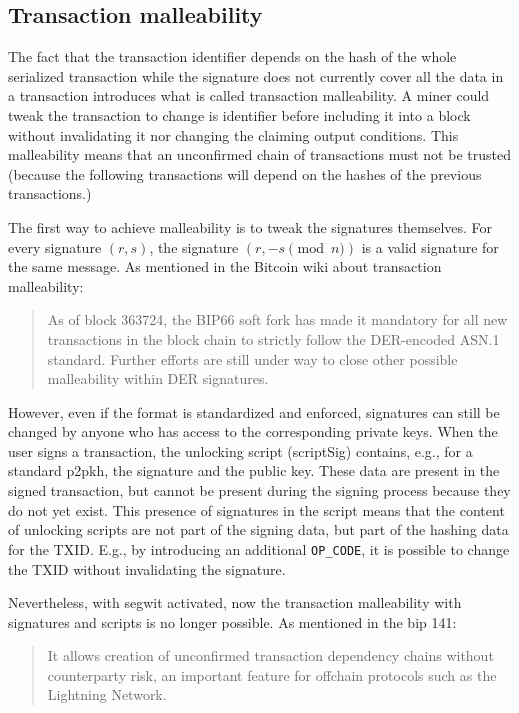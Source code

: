 \subsection{Transaction malleability}

The fact that the transaction identifier depends on the hash of the whole
serialized transaction while the signature does not currently cover all the data
in a transaction introduces what is called transaction malleability. A miner
could tweak the transaction to change is identifier before including it into a
block without invalidating it nor changing the claiming output conditions. This
malleability means that an unconfirmed chain of transactions must not be trusted
(because the following transactions will depend on the hashes of the previous
transactions.)

The first way to achieve malleability is to tweak the signatures themselves. For
every signature $(r, s)$, the signature $(r, -s \pmod n)$ is a valid signature
for the same message. As mentioned in the Bitcoin wiki about transaction
malleability:

\begin{quote}
	As of block 363724, the BIP66 soft fork has made it mandatory for all new
	transactions in the block chain to strictly follow the DER-encoded ASN.1 standard.
	Further efforts are still under way to close other possible malleability within
	DER signatures.
\end{quote}

However, even if the format is standardized and enforced, signatures can still
be changed by anyone who has access to the corresponding private keys. When the
user signs a transaction, the unlocking script (scriptSig) contains, e.g., for a
standard \gls{p2pkh}, the signature and the public key. These data are present
in the signed transaction, but cannot be present during the signing process
because they do not yet exist. This presence of signatures in the script means
that the content of unlocking scripts are not part of the signing data, but part
of the hashing data for the TXID. E.g., by introducing an additional
\texttt{OP\_CODE}, it is possible to change the TXID without invalidating the
signature.

Nevertheless, with \gls{segwit} activated, now the transaction malleability with
signatures and scripts is no longer possible. As mentioned in the \gls{bip} 141:

\begin{quote}
	It allows creation of unconfirmed transaction dependency chains without
	counterparty risk, an important feature for offchain protocols such as the
	Lightning Network.
\end{quote}


